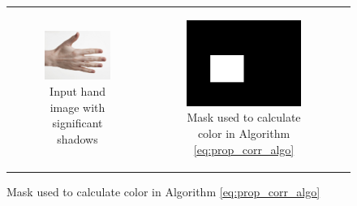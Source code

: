 \begin{figure}[H]
\centering
\begin{tabular}{ccc}
    \multirow{2}{*}[5em]{\begin{subfigure}[b]{0.30\textwidth}
        \includegraphics[width=\textwidth]{images/hand_pale}
        \caption{Input hand image with significant shadows}\label{img:alg_3_eval_hand_pale}
    \end{subfigure}}&
    \begin{subfigure}[b]{0.30\textwidth}
        \includegraphics[width=\textwidth]{images/pale_ave_10_original_mask}
        \caption{Mask used to calculate color in Algorithm \ref{eq:prop_corr_algo}}\label{img:original_mask}
    \end{subfigure} &

\end{tabular}
\end{figure}
